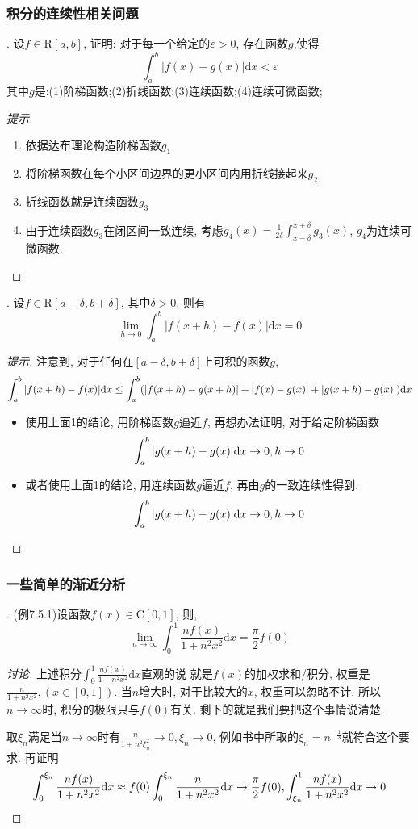 \documentclass[a4paper,12pt]{article}
\begin{document}
\subsubsection*{积分的连续性相关问题}

. 设$f\in\mathrm{R}[a,b]$, 证明: 对于每一个给定的$\varepsilon>0$, 存在函数$g$,使得
\[\int_a^b|f(x)-g(x)|\mathrm{d}x<\varepsilon\]
其中$g$是:(1)阶梯函数;(2)折线函数;(3)连续函数;(4)连续可微函数;
\begin{proof}[提示]
  \ 
  \begin{enumerate}
    \item 依据达布理论构造阶梯函数$g_1$
    \item 将阶梯函数在每个小区间边界的更小区间内用折线接起来$g_2$
    \item 折线函数就是连续函数$g_3$
    \item 由于连续函数$g_3$在闭区间一致连续, 
      考虑$g_4(x)=\frac{1}{2\delta}\int_{x-\delta}^{x+\delta}g_3(x)$,
      $g_4$为连续可微函数.
  \end{enumerate}
\end{proof}

. 设$f\in\mathrm{R}[a-\delta,b+\delta]$, 其中$\delta>0$, 则有
  \[\lim_{h\to0}\int_a^b|f(x+h)-f(x)|\mathrm{d}x=0\]
  \begin{proof}[提示]
    注意到, 对于任何在$[a-\delta,b+\delta]$上可积的函数$g$,
    \[\int_a^b|f(x+h)-f(x)|\mathrm{d} x\leq \int_a^b(|f(x+h)-g(x+h)|+|f(x)-g(x)|+|g(x+h)-g(x)|)\mathrm{d} x\]
    \begin{itemize}
      \item 使用上面1的结论, 用阶梯函数$g$逼近$f$, 
        再想办法证明, 对于给定阶梯函数
        \[\int_a^b |g(x+h)-g(x)|\mathrm{d} x\to0,h\to0\]
      \item 或者使用上面1的结论, 用连续函数$g$逼近$f$, 
        再由$g$的一致连续性得到.
        \[\int_a^b |g(x+h)-g(x)|\mathrm{d} x\to0,h\to0\]
    \end{itemize}
  \end{proof}


\subsubsection*{一些简单的渐近分析}

. (例7.5.1)设函数$f(x)\in\mathrm{C}[0,1]$, 则,
    \[
\lim_{n\to\infty}\int_0^1\frac{nf(x)}{1+n^2x^2}\mathrm{d}x=\frac{\pi}{2}f(0)
    \]
  \begin{proof}[讨论]
    上述积分$\int_0^1\frac{nf(x)}{1+n^2x^2}\mathrm{d}x$直观的说
    就是$f(x)$的加权求和/积分, 
    权重是$\frac{n}{1+n^2x^2},(x\in[0,1])$. 当$n$增大时, 
    对于比较大的$x$, 权重可以忽略不计. 所以$n\to\infty$时, 
    积分的极限只与$f(0)$有关. 剩下的就是我们要把这个事情说清楚.

    取$\xi_n$满足当$n\to\infty$时有$\frac{n}{1+n^2\xi_n^2}\to0,\xi_n\to0$,
    例如书中所取的$\xi_n=n^{-\frac{1}{3}}$就符合这个要求.
    再证明
    \[
      \int_0^{\xi_n}\frac{nf(x)}{1+n^2x^2}\mathrm{d}x\approx f(0)\int_0^{\xi_n}\frac{n}{1+n^2x^2}\mathrm{d} x\to\frac{\pi}{2}f(0),
      \int_{\xi_n}^1\frac{nf(x)}{1+n^2x^2}\mathrm{d}x\to0
    \]
    
  \end{proof}
\end{document}
